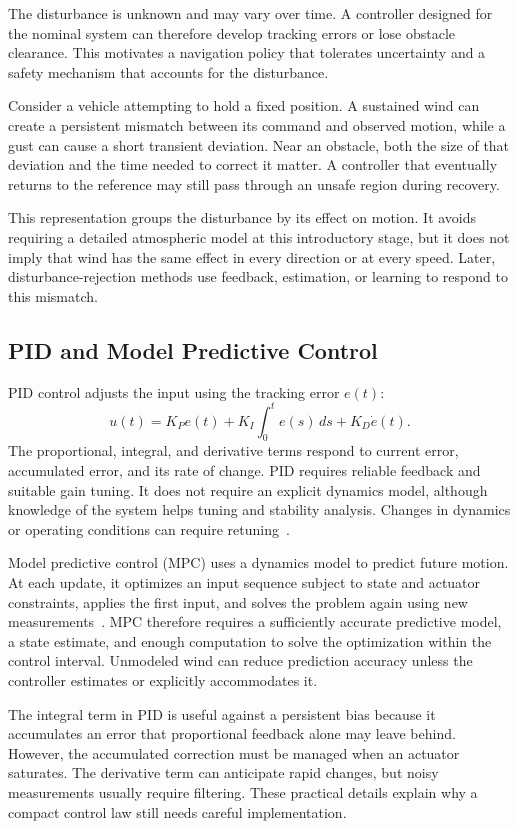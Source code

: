 The disturbance is unknown and may vary over time. A controller designed for the nominal system can therefore develop tracking errors or lose obstacle clearance. This motivates a navigation policy that tolerates uncertainty and a safety mechanism that accounts for the disturbance.

Consider a vehicle attempting to hold a fixed position. A sustained wind can create a persistent mismatch between its command and observed motion, while a gust can cause a short transient deviation. Near an obstacle, both the size of that deviation and the time needed to correct it matter. A controller that eventually returns to the reference may still pass through an unsafe region during recovery.

This representation groups the disturbance by its effect on motion. It avoids requiring a detailed atmospheric model at this introductory stage, but it does not imply that wind has the same effect in every direction or at every speed. Later, disturbance-rejection methods use feedback, estimation, or learning to respond to this mismatch.

\subsection{PID and Model Predictive Control}
PID control adjusts the input using the tracking error $e(t)$:
\begin{equation}
u(t)=K_Pe(t)+K_I\int_0^t e(s)\,ds+K_D\dot e(t).
\end{equation}
The proportional, integral, and derivative terms respond to current error, accumulated error, and its rate of change. PID requires reliable feedback and suitable gain tuning. It does not require an explicit dynamics model, although knowledge of the system helps tuning and stability analysis. Changes in dynamics or operating conditions can require retuning~\cite{rootFeedback}.

Model predictive control (MPC) uses a dynamics model to predict future motion. At each update, it optimizes an input sequence subject to state and actuator constraints, applies the first input, and solves the problem again using new measurements~\cite{rootMurray}. MPC therefore requires a sufficiently accurate predictive model, a state estimate, and enough computation to solve the optimization within the control interval. Unmodeled wind can reduce prediction accuracy unless the controller estimates or explicitly accommodates it.

The integral term in PID is useful against a persistent bias because it accumulates an error that proportional feedback alone may leave behind. However, the accumulated correction must be managed when an actuator saturates. The derivative term can anticipate rapid changes, but noisy measurements usually require filtering. These practical details explain why a compact control law still needs careful implementation.

